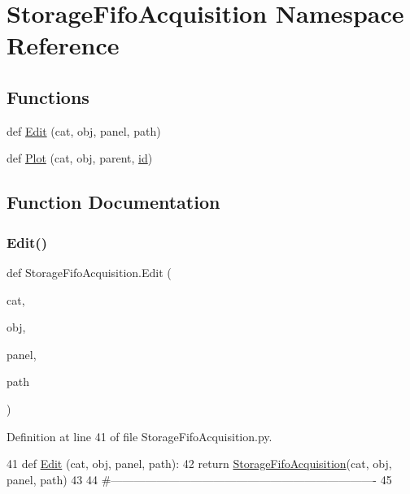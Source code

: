 \hypertarget{namespaceStorageFifoAcquisition}{}\section{Storage\+Fifo\+Acquisition Namespace Reference}
\label{namespaceStorageFifoAcquisition}
\subsection*{Functions}
\begin{DoxyCompactItemize}
\item 
def \hyperlink{namespaceStorageFifoAcquisition_a9eb0b14d8e1902c81fd20c05da11afe2}{Edit} (cat, obj, panel, path)
\item 
def \hyperlink{namespaceStorageFifoAcquisition_aa7203dc3db90e957b8d5fb13aeef23ce}{Plot} (cat, obj, parent, \hyperlink{classObject_af99145335cc61ff6e2798ea17db009d2}{id})
\end{DoxyCompactItemize}


\subsection{Function Documentation}
\mbox{\label{namespaceStorageFifoAcquisition_a9eb0b14d8e1902c81fd20c05da11afe2}} 
\subsubsection{\texorpdfstring{Edit()}{Edit()}}
{\footnotesize\ttfamily def Storage\+Fifo\+Acquisition.\+Edit (\begin{DoxyParamCaption}\item[{}]{cat,  }\item[{}]{obj,  }\item[{}]{panel,  }\item[{}]{path }\end{DoxyParamCaption})}



Definition at line 41 of file Storage\+Fifo\+Acquisition.\+py.


\begin{DoxyCode}
41 \textcolor{keyword}{def }\hyperlink{namespaceStorageFifoAcquisition_a9eb0b14d8e1902c81fd20c05da11afe2}{Edit} (cat, obj, panel, path):
42     \textcolor{keywordflow}{return} \hyperlink{classStorageFifoAcquisition}{StorageFifoAcquisition}(cat, obj, panel, path)
43 
44 \textcolor{comment}{#----------------------------------------------------------------------}
45 
\end{DoxyCode}
\mbox{\label{namespaceStorageFifoAcquisition_aa7203dc3db90e957b8d5fb13aeef23ce}} 
